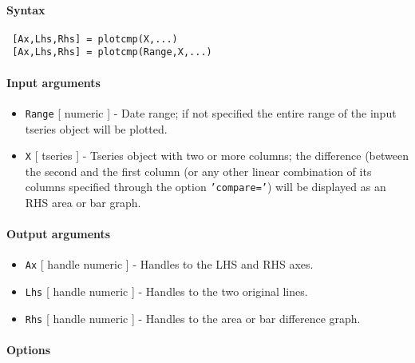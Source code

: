 


	\paragraph{Syntax}
 
 \begin{verbatim}
 [Ax,Lhs,Rhs] = plotcmp(X,...)
 [Ax,Lhs,Rhs] = plotcmp(Range,X,...)
 \end{verbatim}
 
 \paragraph{Input arguments}
 
 \begin{itemize}
 \item
   \texttt{Range} {[} numeric {]} - Date range; if not specified the
   entire range of the input tseries object will be plotted.
 \item
   \texttt{X} {[} tseries {]} - Tseries object with two or more columns;
   the difference (between the second and the first column (or any other
   linear combination of its columns specified through the option
   \texttt{'compare='}) will be displayed as an RHS area or bar graph.
 \end{itemize}
 
 \paragraph{Output arguments}
 
 \begin{itemize}
 \item
   \texttt{Ax} {[} handle \textbar{} numeric {]} - Handles to the LHS and
   RHS axes.
 \item
   \texttt{Lhs} {[} handle \textbar{} numeric {]} - Handles to the two
   original lines.
 \item
   \texttt{Rhs} {[} handle \textbar{} numeric {]} - Handles to the area
   or bar difference graph.
 \end{itemize}
 
 \paragraph{Options}
 
